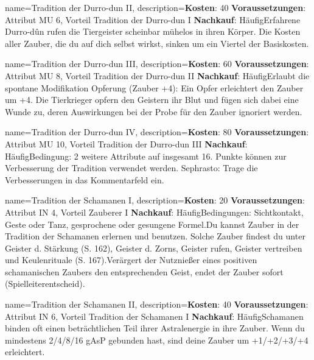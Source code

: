 {
    name={Tradition der Durro-dun II},
    description={\textbf{Kosten}: 40 \textbf{Voraussetzungen}: Attribut MU 6, Vorteil Tradition der Durro-dun I \textbf{Nachkauf}: Häufig\newline Erfahrene Durro-dûn rufen die Tiergeister scheinbar mühelos in ihren Körper. Die Kosten aller Zauber, die du auf dich selbst wirkst, sinken um ein Viertel der Basiskosten.}
}


{
    name={Tradition der Durro-dun III},
    description={\textbf{Kosten}: 60 \textbf{Voraussetzungen}: Attribut MU 8, Vorteil Tradition der Durro-dun II \textbf{Nachkauf}: Häufig\newline Erlaubt die spontane Modifikation Opferung (Zauber +4): Ein Opfer erleichtert den Zauber um +4. Die Tierkrieger opfern den Geistern ihr Blut und fügen sich dabei eine Wunde zu, deren Auswirkungen bei der Probe für den Zauber ignoriert werden.}
}


{
    name={Tradition der Durro-dun IV},
    description={\textbf{Kosten}: 80 \textbf{Voraussetzungen}: Attribut MU 10, Vorteil Tradition der Durro-dun III \textbf{Nachkauf}: Häufig\newline Bedingung: 2 weitere Attribute auf insgesamt 16. Punkte können zur Verbesserung der Tradition verwendet werden. Sephrasto: Trage die Verbesserungen in das Kommentarfeld ein.}
}


{
    name={Tradition der Schamanen I},
    description={\textbf{Kosten}: 20 \textbf{Voraussetzungen}: Attribut IN 4, Vorteil Zauberer I \textbf{Nachkauf}: Häufig\newline Bedingungen: Sichtkontakt, Geste oder Tanz, gesprochene oder gesungene Formel.\newline Du kannst Zauber in der Tradition der Schamanen erlernen und benutzen. Solche Zauber findest du unter Geister d. Stärkung (S. 162), Geister d. Zorns, Geister rufen, Geister vertreiben und Keulenrituale (S. 167).\newline Verärgert der Nutznießer eines positiven schamanischen Zaubers den entsprechenden Geist, endet der Zauber sofort (Spielleiterentscheid).}
}


{
    name={Tradition der Schamanen II},
    description={\textbf{Kosten}: 40 \textbf{Voraussetzungen}: Attribut IN 6, Vorteil Tradition der Schamanen I \textbf{Nachkauf}: Häufig\newline Schamanen binden oft einen beträchtlichen Teil ihrer Astralenergie in ihre Zauber. Wenn du mindestens 2/4/8/16 gAsP gebunden hast, sind deine Zauber um +1/+2/+3/+4 erleichtert.}
}


